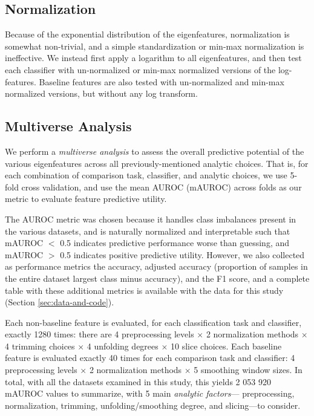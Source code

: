 \documentclass[12pt]{spieman}  %
\begin{document}
\begin{spacing}{2}
\subsection{Normalization}

Because of the exponential distribution of the eigenfeatures, normalization is
somewhat non-trivial, and a simple standardization or min-max normalization is
ineffective. We instead first apply a logarithm to all eigenfeatures, and then
test each classifier with un-normalized or min-max normalized versions of the
log-features. Baseline features are also tested with un-normalized and min-max
normalized versions, but without any log transform.





\subsection{Multiverse Analysis}
\label{sec:multiverse}

We perform a \textit{multiverse
analysis}\cite{steegenIncreasingTransparencyMultiverse2016} to assess the
overall predictive potential of the various eigenfeatures across all
previously-mentioned analytic choices. That is, for each combination of
comparison task, classifier, and analytic choices, we use 5-fold cross
validation, and use the mean AUROC (mAUROC) across folds as our metric to
evaluate feature predictive utility.

The AUROC metric was chosen because it handles class imbalances present in the
various datasets, and is naturally normalized and interpretable such that
mAUROC \(<\) 0.5 indicates predictive performance worse than guessing, and
mAUROC \(>\) 0.5 indicates positive predictive
utility\cite{mandrekarReceiverOperatingCharacteristic2010}. However, we also
collected as performance metrics the accuracy, adjusted accuracy (proportion
of samples in the entire dataset largest class minus accuracy), and the F1 score, and a complete
table with these additional metrics is available with the data for this study
(Section \ref{sec:data-and-code}).

Each non-baseline feature is evaluated, for each classification task and
classifier, exactly 1280 times: there are 4 preprocessing levels \(\times\) 2
normalization methods \(\times\) 4 trimming choices \(\times\) 4 unfolding
degrees  \(\times\) 10 slice choices. Each baseline feature is evaluated
exactly 40 times for each comparison task and classifier: 4 preprocessing
levels \(\times\) 2 normalization methods \(\times\) 5 smoothing window sizes.
In total, with all the datasets examined in this study, this yields 2 053 920
mAUROC values to summarize, with 5 main \textit{analytic factors}—
preprocessing, normalization, trimming, unfolding/smoothing degree, and
slicing—to consider.


\end{spacing}
\end{document}
